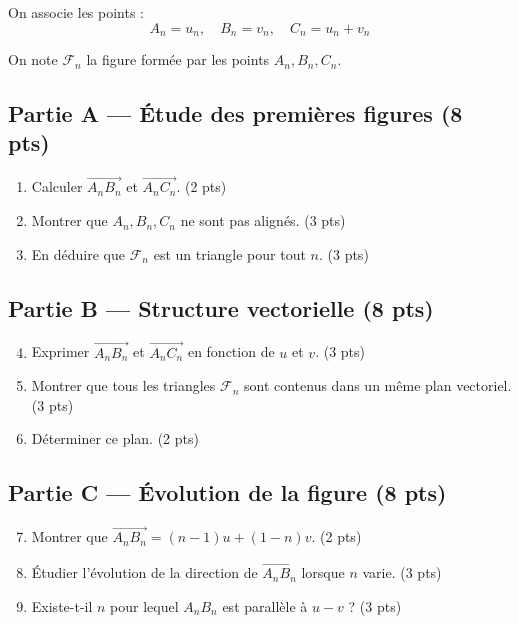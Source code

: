 \documentclass[11pt,a4paper]{article}
\begin{document}
On associe les points :
\[
A_n = u_n, \quad B_n = v_n, \quad C_n = u_n + v_n
\]

On note $\mathcal{F}_n$ la figure formée par les points $A_n,B_n,C_n$.

\subsection*{Partie A — Étude des premières figures (8 pts)}

\begin{enumerate}
\item Calculer $\overrightarrow{A_nB_n}$ et $\overrightarrow{A_nC_n}$. \hfill (2 pts)
\item Montrer que $A_n,B_n,C_n$ ne sont pas alignés. \hfill (3 pts)
\item En déduire que $\mathcal{F}_n$ est un triangle pour tout $n$. \hfill (3 pts)
\end{enumerate}

\subsection*{Partie B — Structure vectorielle (8 pts)}

\begin{enumerate}
\setcounter{enumi}{3}
\item Exprimer $\overrightarrow{A_nB_n}$ et $\overrightarrow{A_nC_n}$ en fonction de $u$ et $v$. \hfill (3 pts)
\item Montrer que tous les triangles $\mathcal{F}_n$ sont contenus dans un même plan vectoriel. \hfill (3 pts)
\item Déterminer ce plan. \hfill (2 pts)
\end{enumerate}

\subsection*{Partie C — Évolution de la figure (8 pts)}

\begin{enumerate}
\setcounter{enumi}{6}
\item Montrer que $\overrightarrow{A_nB_n} = (n-1)u + (1-n)v$. \hfill (2 pts)
\item Étudier l’évolution de la direction de $\overrightarrow{A_nB_n}$ lorsque $n$ varie. \hfill (3 pts)
\item Existe-t-il $n$ pour lequel $A_nB_n$ est parallèle à $u-v$ ? \hfill (3 pts)
\end{enumerate}
\end{document}
